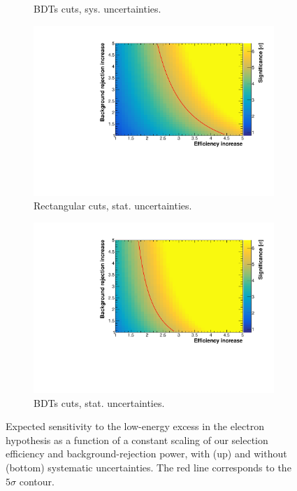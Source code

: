 \begin{figure}[htbp]
\begin{center}
\begin{subfigure}{0.48\textwidth}
      \caption{BDTs cuts, sys. uncertainties.} 
    \end{subfigure}
     \begin{subfigure}{0.48\textwidth}
      \includegraphics[width=\linewidth]{figures/cuts_2d_stat.pdf}
      \caption{Rectangular cuts, stat. uncertainties.}  
    \end{subfigure}\hfill
    \begin{subfigure}{0.48\textwidth}
      \includegraphics[width=\linewidth]{figures/bdt_2d_stat.pdf}
      \caption{BDTs cuts, stat. uncertainties.} 
    \end{subfigure}
    \caption{Expected sensitivity to the low-energy excess in the electron hypothesis as a function of a constant scaling of our selection efficiency and background-rejection power, with (up) and without (bottom) systematic uncertainties. The red line corresponds to the $5\sigma$ contour.}\label{fig:improvements}
	\end{center}
\end{figure}

